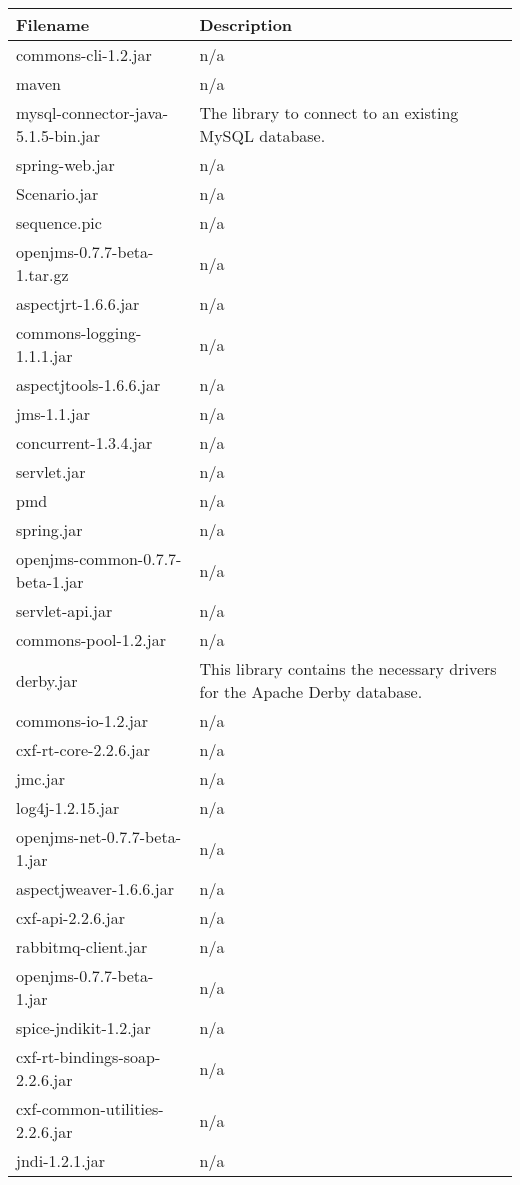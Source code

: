 \begin{center}
\begin{longtable}{|p{}|p{}|}
\hline 
Filename & Description\\
\hline
\hline 
commons-cli-1.2.jar & n/a\\
\hline 
maven & n/a\\
\hline 
mysql-connector-java-5.1.5-bin.jar & The library to connect to an existing MySQL database.\\
\hline 
spring-web.jar & n/a\\
\hline 
Scenario.jar & n/a\\
\hline 
sequence.pic & n/a\\
\hline 
openjms-0.7.7-beta-1.tar.gz & n/a\\
\hline 
aspectjrt-1.6.6.jar & n/a\\
\hline 
commons-logging-1.1.1.jar & n/a\\
\hline 
aspectjtools-1.6.6.jar & n/a\\
\hline 
jms-1.1.jar & n/a\\
\hline 
concurrent-1.3.4.jar & n/a\\
\hline 
servlet.jar & n/a\\
\hline 
pmd & n/a\\
\hline 
spring.jar & n/a\\
\hline 
openjms-common-0.7.7-beta-1.jar & n/a\\
\hline 
servlet-api.jar & n/a\\
\hline 
commons-pool-1.2.jar & n/a\\
\hline 
derby.jar & This library contains the necessary drivers for the Apache Derby database.\\
\hline 
commons-io-1.2.jar & n/a\\
\hline 
cxf-rt-core-2.2.6.jar & n/a\\
\hline 
jmc.jar & n/a\\
\hline 
log4j-1.2.15.jar & n/a\\
\hline 
openjms-net-0.7.7-beta-1.jar & n/a\\
\hline 
aspectjweaver-1.6.6.jar & n/a\\
\hline 
cxf-api-2.2.6.jar & n/a\\
\hline 
rabbitmq-client.jar & n/a\\
\hline 
openjms-0.7.7-beta-1.jar & n/a\\
\hline 
spice-jndikit-1.2.jar & n/a\\
\hline 
cxf-rt-bindings-soap-2.2.6.jar & n/a\\
\hline 
cxf-common-utilities-2.2.6.jar & n/a\\
\hline 
jndi-1.2.1.jar & n/a\\
\hline 
\end{longtable}
\label{tabular:libraries}
\end{center}
